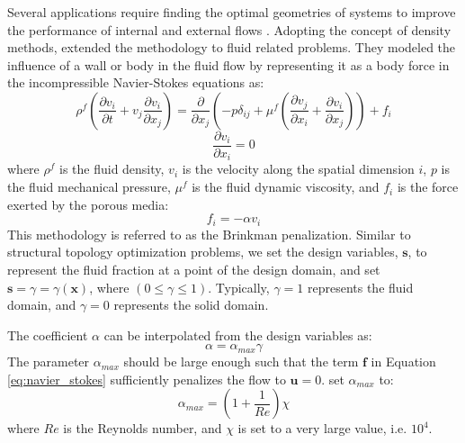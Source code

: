 Several applications require finding the optimal geometries of systems to improve the performance of internal and external flows \citep{Maute:14}. Adopting the concept of density methods, \citep{BP:03} extended the methodology to fluid related problems. They modeled the influence of a wall or body in the fluid flow by representing it as a body force in the incompressible Navier-Stokes equations as:
%
\begin{equation}
	\label{eq:navier_stokes}
	\rho^{f} \left( \frac{\partial v_{i}}{\partial t} + v_{j} \frac{\partial v_{i}}{\partial x_{j}} \right) = \frac{\partial}{\partial x_{j}} \left( -p \delta_{ij} + \mu^{f} \left( \frac{\partial v_{j}}{\partial x_{i}} + \frac{\partial v_{i}}{\partial x_{j}} \right) \right) + f_{i}
\end{equation}
%
\begin{equation}
	\label{eq:divergence_stokes}
	\frac{\partial v_{i}}{\partial x_{i}} = 0
\end{equation}
%
where $\rho^{f}$ is the fluid density, $v_{i}$ is the velocity along the spatial dimension $i$, $p$ is the fluid mechanical pressure, $\mu^{f}$ is the fluid dynamic viscosity, and $f_{i}$ is the force exerted by the porous media:
%
\begin{equation}
	\label{eq:brinkman_force}
	f_{i} = - \alpha v_{i}
\end{equation}
%
This methodology is referred to as the Brinkman penalization. Similar to structural topology optimization problems, we set the design variables, $\mathbf{s}$, to represent the fluid fraction at a point of the design domain, and set $\mathbf{s}=\gamma=\gamma \left( \mathbf{x} \right)$, where $\left( 0 \le \gamma \le 1 \right)$. Typically, $\gamma = 1$ represents the fluid domain, and $\gamma=0$ represents the solid domain.

The coefficient $\alpha$ can be interpolated from the design variables as:
%
\begin{equation}
	\label{eq:alpha_linear}
	\alpha = \alpha_{max} \gamma
\end{equation}
%
The parameter $\alpha_{max}$ should be large enough such that the term $\mathbf{f}$ in Equation \ref{eq:navier_stokes} sufficiently penalizes the flow to $\mathbf{u}=0$. \citep{KMK:12} set $\alpha_{max}$ to:
%
\begin{equation}
	\label{eq:alpha_max}
	\alpha_{max} = \left( 1 + \frac{1}{Re} \right) \chi
\end{equation}
%
where $Re$ is the Reynolds number, and $\chi$ is set to a very large value, i.e. $10^4$.

